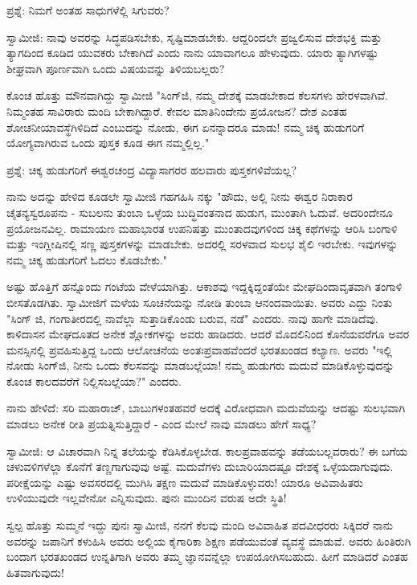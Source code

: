 ಪ್ರಶ್ನೆ: ನಿಮಗೆ ಅಂತಹ ಸಾಧುಗಳೆಲ್ಲಿ ಸಿಗುವರು?

ಸ್ವಾಮೀಜಿ: ನಾವು ಅವರನ್ನು ಸಿದ್ಧಪಡಿಸಬೇಕು, ಸೃಷ್ಟಿಮಾಡಬೇಕು. ಆದ್ದರಿಂದಲೇ ಪ್ರಜ್ವಲಿಸುವ ದೇಶಭಕ್ತಿ ಮತ್ತು ತ್ಯಾಗದಿಂದ ಕೂಡಿದ ಯುವಕರು ಬೇಕಾಗಿದೆ ಎಂದು ನಾನು ಯಾವಾಗಲೂ ಹೇಳುವುದು. ಯಾರು ತ್ಯಾಗಿಗಳಷ್ಟು ಶೀಘ್ರವಾಗಿ ಪೂರ್ಣವಾಗಿ ಒಂದು ವಿಷಯವನ್ನು ತಿಳಿಯಬಲ್ಲರು?

ಕೊಂಚ ಹೊತ್ತು ಮೌನವಾಗಿದ್ದು ಸ್ವಾಮೀಜಿ "ಸಿಂಗ್‌ಜಿ, ನಮ್ಮ ದೇಶಕ್ಕೆ ಮಾಡಬೇಕಾದ ಕೆಲಸಗಳು ಹೇರಳವಾಗಿವೆ. ನಿಮ್ಮಂತಹ ಸಾವಿರಾರು ಮಂದಿ ಬೇಕಾಗಿದ್ದಾರೆ. ಕೇವಲ ಮಾತಿನಿಂದೇನು ಪ್ರಯೋಜನ? ದೇಶ ಎಂತಹ ಶೋಚನೀಯಾವಸ್ಥೆಗಿಳಿದಿದೆ ಎಂಬುದನ್ನು ನೋಡು, ಈಗ ಏನನ್ನಾದರೂ ಮಾಡು! ನಮ್ಮ ಚಿಕ್ಕ ಹುಡುಗರಿಗೆ ಯೋಗ್ಯವಾಗಿರುವ ಒಂದು ಪುಸ್ತಕ ಕೂಡ ಈಗ ನಮ್ಮಲ್ಲಿಲ್ಲ."

ಪ್ರಶ್ನೆ: ಚಿಕ್ಕ ಹುಡುಗರಿಗೆ ಈಶ್ವರಚಂದ್ರ ವಿದ್ಯಾಸಾಗರರ ಹಲವಾರು ಪುಸ್ತಕಗಳಿವೆಯಲ್ಲ?

ನಾನು ಅದನ್ನು ಹೇಳಿದ ಕೂಡಲೇ ಸ್ವಾಮೀಜಿ ಗಹಗಹಿಸಿ ನಕ್ಕು "ಹೌದು, ಅಲ್ಲಿ ನೀನು ಈಶ್ವರ ನಿರಾಕಾರ ಚೈತನ್ಯಸ್ವರೂಪನು - ಸುಬಲನು ತುಂಬಾ ಒಳ್ಳೆಯ ಬುದ್ಧಿವಂತನಾದ ಹುಡುಗ, ಮುಂತಾಗಿ ಓದುವೆ. ಅದರಿಂದೇನೂ ಪ್ರಯೋಜನವಿಲ್ಲ. ರಾಮಾಯಣ ಮಹಾಭಾರತ ಉಪನಿಷತ್ತು ಮುಂತಾದವುಗಳಿಂದ ಚಿಕ್ಕ ಕಥೆಗಳನ್ನು ಆರಿಸಿ ಬಂಗಾಳಿ ಮತ್ತು ಇಂಗ್ಲೀಷಿನಲ್ಲಿ ಸಣ್ಣ ಪುಸ್ತಕಗಳನ್ನು ಮಾಡಬೇಕು. ಅದರಲ್ಲಿ ಸರಳವಾದ ಸುಲಭ ಶೈಲಿ ಇರಬೇಕು. ಇವುಗಳನ್ನು ನಮ್ಮ ಚಿಕ್ಕ ಹುಡುಗರಿಗೆ ಓದಲು ಕೊಡಬೇಕು."

ಅಷ್ಟು ಹೊತ್ತಿಗೆ ಹನ್ನೊಂದು ಗಂಟೆಯ ವೇಳೆಯಾಗಿತ್ತು. ಆಕಾಶವು ಇದ್ದಕ್ಕಿದ್ದಂತೆಯೇ ಮೇಘದಿಂದಾವೃತವಾಗಿ ತಂಗಾಳಿ ಬೀಸತೊಡಗಿತು. ಸ್ವಾಮೀಜಿಗೆ ಮಳೆಯ ಸೂಚನೆಯನ್ನು ನೋಡಿ ತುಂಬಾ ಆನಂದವಾಯಿತು. ಅವರು ಎದ್ದು ನಿಂತು "ಸಿಂಗ್ ಜಿ, ಗಂಗಾತೀರದಲ್ಲಿ ನಾವೆಲ್ಲಾ ಸುತ್ತಾಡಿಕೊಂಡು ಬರುವ, ನಡೆ" ಎಂದರು. ನಾವು ಹಾಗೇ ಮಾಡಿದೆವು. ಕಾಳಿದಾಸನ ಮೇಘದೂತದ ಅನೇಕ ಶ್ಲೋಕಗಳನ್ನು ಅವರು ಹಾಡಿದರು. ಆದರೆ ಮೊದಲಿನಿಂದ ಕೊನೆಯವರೆಗೂ ಅವರ ಮನಸ್ಸಿನಲ್ಲಿ ಪ್ರವಹಿಸುತ್ತಿದ್ದ ಒಂದು ಆಲೋಚನೆಯ ಅಂತಃಪ್ರವಾಹವೆಂದರೆ ಭರತಖಂಡದ ಕಲ್ಯಾಣ. ಅವರು "ಇಲ್ಲಿ ನೋಡು ಸಿಂಗ್‌ಜಿ, ನೀನು ಒಂದು ಕೆಲಸವನ್ನು ಮಾಡಬಲ್ಲೆಯಾ! ನಮ್ಮ ಹುಡುಗರು ಮದುವೆ ಮಾಡಿಕೊಳ್ಳುವುದನ್ನು ಕೊಂಚ ಕಾಲದವರೆಗೆ ನಿಲ್ಲಿಸಬಲ್ಲೆಯಾ?" ಎಂದರು.

ನಾನು ಹೇಳಿದೆ: ಸರಿ ಮಹಾರಾಜ್, ಬಾಬುಗಳಂತಹವರೆ ಅದಕ್ಕೆ ವಿರೋಧವಾಗಿ ಮದುವೆಯನ್ನು ಆದಷ್ಟು ಸುಲಭವಾಗಿ ಮಾಡಲು ಅನೇಕ ರೀತಿ ಪ್ರಯತ್ನಿಸುತ್ತಿದ್ದಾರೆ - ಎಂದ ಮೇಲೆ ನಾವು ಮಾಡಲು ಹೇಗೆ ಸಾಧ್ಯ?

ಸ್ವಾಮೀಜಿ: ಆ ವಿಚಾರವಾಗಿ ನಿನ್ನ ತಲೆಯನ್ನು ಕೆಡಿಸಿಕೊಳ್ಳಬೇಡ. ಕಾಲಪ್ರವಾಹವನ್ನು ತಡೆಯಬಲ್ಲವರಾರು? ಈ ಬಗೆಯ ಚಳುವಳಿಗಳೆಲ್ಲಾ ಕೊನೆಗೆ ತಣ್ಣಗಾಗುವುವು ಅಷ್ಟೆ. ಮದುವೆಗಳು ದುಬಾರಿಯಾದಷ್ಟೂ ದೇಶಕ್ಕೆ ಒಳ್ಳೆಯದಾಗುವುದು. ಪರೀಕ್ಷೆಯನ್ನು ಎಷ್ಟು ಅವಸರದಲ್ಲಿ ಮುಗಿಸಿ ತಕ್ಷಣ ಮದುವೆ ಮಾಡಿಕೊಳ್ಳುವರು! ಯಾರೂ ಅವಿವಾಹಿತರು ಉಳಿಯುವುದೇ ಇಲ್ಲವೇನೋ ಎನ್ನಿಸುವುದು. ಪುನಃ ಮುಂದಿನ ವರುಷ ಅದೇ ಸ್ಥಿತಿ!

ಸ್ವಲ್ಪ ಹೊತ್ತು ಸುಮ್ಮನೆ ಇದ್ದು ಪುನಃ ಸ್ವಾಮೀಜಿ, ನನಗೆ ಕೆಲವು ಮಂದಿ ಅವಿವಾಹಿತ ಪದವೀಧರರು ಸಿಕ್ಕಿದರೆ ನಾನು ಅವರನ್ನು ಜಪಾನಿಗೆ ಕಳುಹಿಸಿ ಅವರು ಅಲ್ಲಿಯ ಕೈಗಾರಿಕಾ ಶಿಕ್ಷಣ ಪಡೆಯುವಂತೆ ವ್ಯವಸ್ಥೆ ಮಾಡುವೆ. ಅವರು ಹಿಂತಿರುಗಿ ಬಂದಾಗ ಭರತಖಂಡದ ಉನ್ನತಿಗಾಗಿ ಅವರು ತಮ್ಮ ಜ್ಞಾನವನ್ನೆಲ್ಲಾ ಉಪಯೋಗಿಸಬಹುದು. ಹೀಗೆ ಮಾಡಿದರೆ ಎಂತಹ ಹಿತವಾಗುವುದು!

